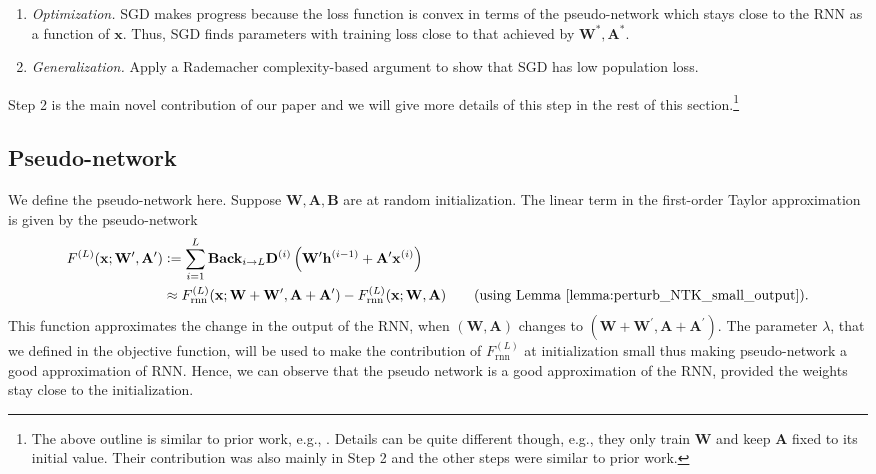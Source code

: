 \begin{enumerate}[leftmargin=*, itemsep=0.1pt, topsep=0pt]
	\item \emph{Optimization.} SGD makes progress because the loss function is convex in terms of the pseudo-network which stays close to the RNN as a function of $\mathbf{x}$. Thus, SGD finds parameters with training loss close to that achieved by $\mathbf{W}^{\ast}, \mathbf{A}^{\ast}$.
	\item \emph{Generalization.} Apply a Rademacher complexity-based argument to show that SGD has low population loss.
\end{enumerate}
Step 2 is the main novel contribution of our paper and we will give more details of this step in the rest of this section.\footnote{The above outline is similar to prior work, e.g., \cite{allen2019can}. Details can be quite different though, e.g., they only train $\mathbf{W}$ and keep $\mathbf{A}$ fixed to its initial value. 
Their contribution was also mainly in Step 2 and the other steps were similar to prior work.} 
\subsection{Pseudo-network}\label{sec:pseudo-network}
We define the pseudo-network here. Suppose $\mathbf{W}, \mathbf{A}, \mathbf{B}$ are at random initialization.
 The linear term in the first-order Taylor approximation is given by the pseudo-network
\begin{align} 
	F^{(L)}(\bx; \mathbf{W}', \mathbf{A}') 
	&:= \sum_{i=1}^{L}  \mathbf{Back}_{i \rightarrow L} \mathbf{D}^{(i)} \left(\mathbf{W'} \mathbf{h}^{(i-1)} + \mathbf{A'} \mathbf{x}^{(i)}\right) \label{eqn:linear-approximation}\\&
	\approx F_{\mathrm{rnn}}^{(L)}(\bx; \mathbf{W}+\mathbf{W}', \mathbf{A}+\mathbf{A}') - F_{\mathrm{rnn}}^{(L)}(\bx; \mathbf{W}, \mathbf{A}) \tag{using Lemma~\ref{lemma:perturb_NTK_small_output}}.
\end{align}
 This function approximates the change in the output of the RNN, when $(\mathbf{W}, \mathbf{A})$ changes to $(\mathbf{W}+\mathbf{W}^{'}, \mathbf{A}+\mathbf{A}^{'})$. 
 The parameter $\lambda$, that we defined in the objective function, will be used to make the contribution of  $F_{\mathrm{rnn}}^{(L)}$ at initialization small thus making pseudo-network a good approximation of RNN. Hence, we can observe that the pseudo network is a good approximation of the RNN, provided the weights stay close to the initialization.
 
